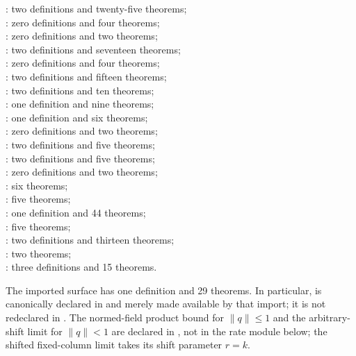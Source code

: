 \documentclass[11pt,a4paper,oneside,openany]{book}
\theoremstyle{definition}
\theoremstyle{remark}
\begin{document}
\begin{center}
: two definitions and twenty-five theorems;\\
: zero definitions and four theorems;\\
: zero definitions and two theorems;\\
: two definitions and seventeen theorems;\\
: zero definitions and four theorems;\\
: two definitions and fifteen theorems;\\
: two definitions and ten theorems;\\
: one definition and nine theorems;\\
: one definition and six theorems;\\
: zero definitions and two theorems;\\
: two definitions and five theorems;\\
: two definitions and five theorems;\\
: zero definitions and two theorems;\\
: six theorems;\\
: five theorems;\\
: one definition and 44 theorems;\\
: five theorems;\\
: two definitions and thirteen theorems;\\
: two theorems;\\
: three definitions and 15 theorems.
\end{center}

The imported  surface has one definition
and 29 theorems.  In particular,
 is canonically declared in
 and merely made available by that import; it
is not redeclared in .
The normed-field product bound
for \(\lVert q\rVert\leq1\) and the arbitrary-shift limit
for \(\lVert q\rVert<1\) are declared in
, not in the rate module below; the
shifted fixed-column limit takes its shift parameter \(r=k\).
\end{document}
